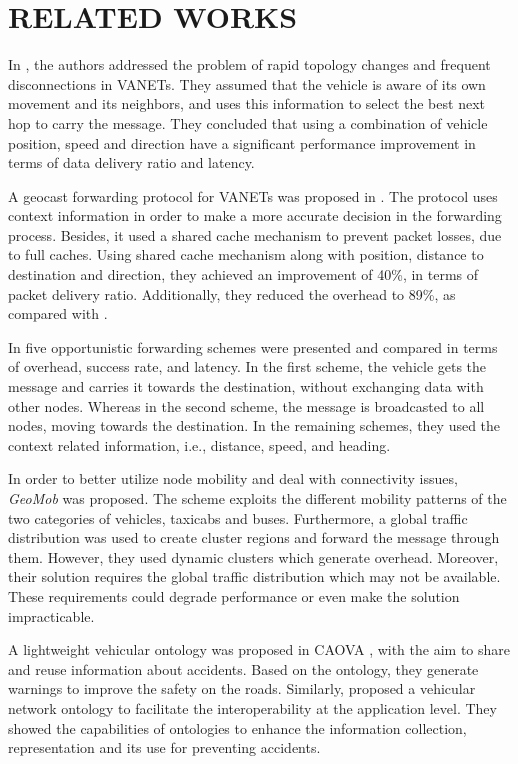 \documentclass[letterpaper, 10 pt, conference]{ieeeconf}  %
\begin{document}
\section{RELATED WORKS}

In \cite{magf2009}, the authors addressed the problem of rapid topology changes and frequent disconnections in VANETs. They assumed that the vehicle is aware of its own movement and its neighbors, and uses this information to select the best next hop to carry the message. They concluded that using a combination of vehicle position, speed and direction have a significant performance improvement in terms of data delivery ratio and latency.

A geocast forwarding protocol for VANETs was proposed in \cite{vcarp2012}. The protocol uses context information in order to make a more accurate decision in the forwarding process. Besides, it used a shared cache mechanism to prevent packet losses, due to full caches. Using shared cache mechanism along with position, distance to destination and direction, they achieved an improvement of 40\%, in terms of packet delivery ratio. Additionally, they reduced the overhead to 89\%, as compared with \cite{maihofer2004}.

In \cite{move2005} five opportunistic forwarding schemes were presented and compared in terms of overhead, success rate, and latency. In the first scheme, the vehicle gets the message and carries it towards the destination, without exchanging data with other nodes. Whereas in the second scheme, the message is broadcasted to all nodes, moving towards the destination. In the remaining schemes, they used the context related information, i.e., distance, speed, and heading.

In order to better utilize node mobility and deal with connectivity issues, \emph{GeoMob} \cite{zhang2014} was proposed. The scheme exploits the different mobility patterns of the two categories of vehicles, taxicabs and buses. Furthermore, a global traffic distribution was used to create cluster regions and forward the message through them. However, they used dynamic clusters which generate overhead. Moreover, their solution requires the global traffic distribution which may not be available. These requirements could degrade performance or even make the solution impracticable.

A lightweight vehicular ontology was proposed in CAOVA \cite{caova2012}, with the aim to share and reuse information about accidents. Based on the ontology, they generate warnings to improve the safety on the roads. Similarly, \cite{groza2014} proposed a vehicular network ontology to facilitate the interoperability at the application level. They showed the capabilities of ontologies to enhance the information collection, representation and its use for preventing accidents.
\end{document}
